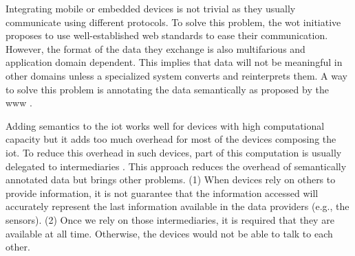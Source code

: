 
% 

Integrating mobile or embedded devices is not trivial as they usually communicate using different protocols.
To solve this problem, the \acl{wot} initiative proposes to use well-established web standards to ease their communication.
However, the format of the data they exchange is also multifarious and application domain dependent.
This implies that data will not be meaningful in other domains unless a specialized system converts and reinterprets them.
A way to solve this problem is annotating the data semantically as proposed by the \ac{www} \citep{ChuaG10,kimKC11}.

Adding semantics to the \ac{iot} works well for devices with high computational capacity but it adds too much overhead for most of the devices composing the \ac{iot}.
To reduce this overhead in such devices, part of this computation is usually delegated to intermediaries \citep{honkola_smart-m3_2010}.
This approach reduces the overhead of semantically annotated data but brings other problems.
(1) When devices rely on others to provide information, it is not guarantee that the information accessed will accurately represent the last information available in the data providers (e.g., the sensors).
(2) Once we rely on those intermediaries, it is required that they are available at all time.
Otherwise, the devices would not be able to talk to each other.

